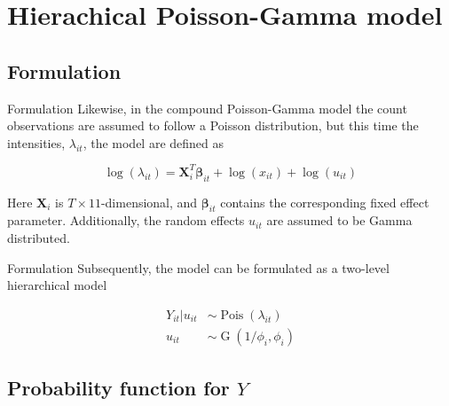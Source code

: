 \documentclass[aspectratio=169]{beamer}
\DeclareMathOperator{\G}{G}
\DeclareMathOperator{\Pois}{Pois}
\begin{document}
\hypertarget{hierachical-poisson-gamma-model}{%
\section{Hierachical Poisson-Gamma
model}\label{hierachical-poisson-gamma-model}}

\hypertarget{formulation-1}{%
\subsection{Formulation}\label{formulation-1}}

\begin{frame}{Formulation}
Likewise, in the compound Poisson-Gamma model the count observations are
assumed to follow a Poisson distribution, but this time the intensities,
\(\lambda_{it}\), the model are defined as

\begin{equation}
  \log(\lambda_{it})=\mathbf{X}_i^T\mathbf{\beta}_{it}+\log(x_{it})+\log(u_{it})
\end{equation}

Here \(\mathbf{X}_i\) is \(T\times11\)-dimensional, and
\(\mathbf{\beta}_{it}\) contains the corresponding fixed effect
parameter. Additionally, the random effects \(u_{it}\) are assumed to be
Gamma distributed.
\end{frame}

\begin{frame}{Formulation}
\protect\hypertarget{formulation-2}{}
Subsequently, the model can be formulated as a two-level hierarchical
model

\begin{subequations} \label{eq:PoisGam}
  \begin{alignat}{2}
    Y_{it}|u_{it} &\sim \Pois (\lambda_{it}) \label{eq:pois_g0} \\ 
    u_{it} &\sim \G(1/\phi_{i},\phi_{i}) \label{eq:pois_g1}
  \end{alignat}
\end{subequations}
\end{frame}

\hypertarget{probability-function-for-y}{%
\subsection{\texorpdfstring{Probability function for
\(Y\)}{Probability function for Y}}\label{probability-function-for-y}}
\end{document}
